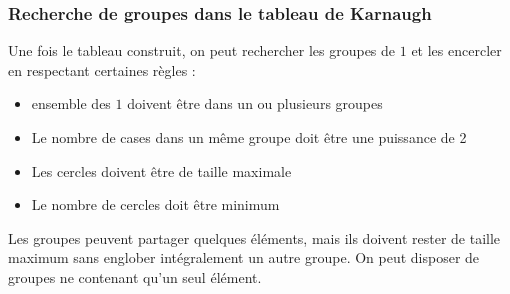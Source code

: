 \documentclass[11pt,a4paper]{article}
\begin{document}
\medskip


\subsubsection{Recherche de groupes dans le tableau de Karnaugh}

\medskip

Une fois le tableau construit, on peut rechercher les groupes de $ 1 $ et les encercler en respectant certaines règles :

\begin{itemize}
\item ensemble des $ 1 $ doivent être dans un ou plusieurs groupes
\item Le nombre de cases dans un même groupe doit être une puissance de 2
\item Les cercles doivent être de taille maximale
\item Le nombre de cercles doit être minimum
\end{itemize}

Les groupes peuvent partager quelques éléments, mais ils doivent rester de taille maximum sans englober intégralement un autre groupe.
On peut disposer de groupes ne contenant qu'un seul élément.

\medskip
\end{document}
